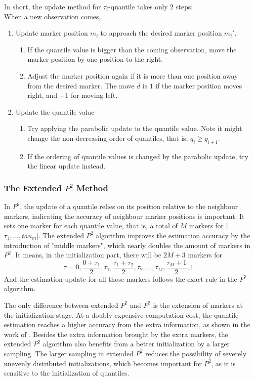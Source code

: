 In short, the update method for $\tau_i$-quantile takes only 2 steps:\\
When a new observation comes,
\begin{enumerate}
    \item Update marker position $m_i$ to approach the desired marker position $m_i \prime$.
    \begin{enumerate}
        \item If the quantile value is bigger than the coming observation, move the marker position by one position to the right.
        \item Adjust the marker position again if it is more than one position away from the desired marker. The move $d$ is $1$ if the marker position moves right, and $-1$ for moving left.
    \end{enumerate}
    \item Update the quantile value
    \begin{enumerate}
        \item Try applying the parabolic update to the quantile value. Note it might change the non-decreasing order of quantiles, that is, $q_i \geq q_{i+1}$.
        \item If the ordering of quantile values is changed by the parabolic update, try the linear update instead.
    \end{enumerate}
\end{enumerate}


\subsubsection{The Extended $P^2$ Method}
In $P^2$, the update of a quantile relies on its position relative to the neighbour markers, indicating the accuracy of neighbour marker positions is important. 
It sets one marker for each quantile value, that is, a total of $M$ markers for [$\tau_1, ..., tau_m$].
The extended $P^2$ algorithm improves the estimation accuracy by the introduction of "middle markers",  which nearly doubles the amount of markers in $P^2$. 
It means, in the initialization part, there will be $2M+3$ markers for
$$
\tau = 0, \frac{0+\tau_1}{2}, \tau_1, \frac{\tau_1 + \tau_2}{2}, \tau_2, ..., \tau_{M}, \frac{\tau_M+1}{2}, 1
$$
And the estimation update for all those markers follows the exact rule in the $P^2$ algorithm.

The only difference between extended $P^2$ and $P^2$ is the extension of markers at the initialization stage. At a doubly expensive computation cost, the quantile estimation reaches a higher accuracy from the extra information, as shown in the work of \citeauthor{raatikainenSequentialProcedureSimultaneous1993}\cite{raatikainenSequentialProcedureSimultaneous1993}. Besides the extra information brought by the extra markers, the extended $P^2$ algorithm also benefits from a better initialization by a larger sampling. The larger sampling in extended $P^2$ reduces the possibility of severely unevenly distributed initializations, which becomes important for  $P^2$, as it is sensitive to the initialization of quantiles.

